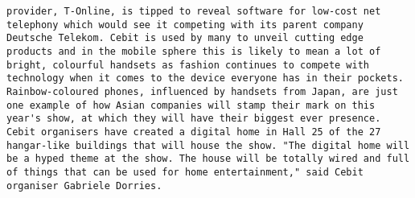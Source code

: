 \documentclass[11pt]{article}
\begin{document}
\begin{Verbatim}[commandchars=\\\{\}]
provider, T-Online, is tipped to reveal software for low-cost net telephony which would see it competing with its parent company Deutsche Telekom. Cebit is used by many to unveil cutting edge products and in the mobile sphere this is likely to mean a lot of bright, colourful handsets as fashion continues to compete with technology when it comes to the device everyone has in their pockets. Rainbow-coloured phones, influenced by handsets from Japan, are just one example of how Asian companies will stamp their mark on this year's show, at which they will have their biggest ever presence. Cebit organisers have created a digital home in Hall 25 of the 27 hangar-like buildings that will house the show. "The digital home will be a hyped theme at the show. The house will be totally wired and full of things that can be used for home entertainment," said Cebit organiser Gabriele Dorries.                                                                                                                                                                                                                                                                                                                                                                                                                                                                                                                                                                                                                                                                                                                                                                                                                                                                                                                                                                        

\end{Verbatim}
\end{document}
